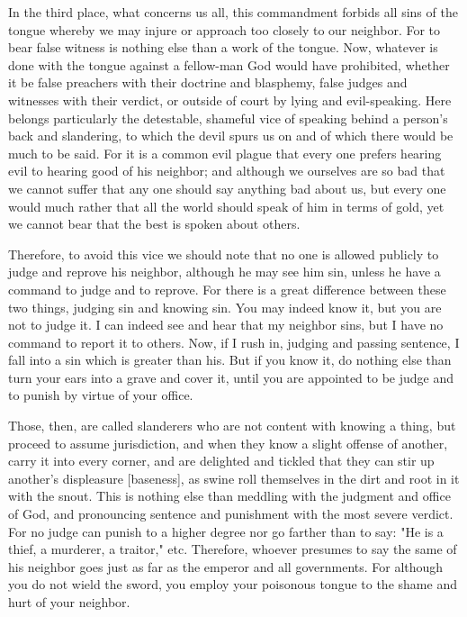 In the third place, what concerns us all, this commandment forbids all
sins of the tongue whereby we may injure or approach too closely to our
neighbor. For to bear false witness is nothing else than a work of the
tongue. Now, whatever is done with the tongue against a fellow-man God
would have prohibited, whether it be false preachers with their
doctrine and blasphemy, false judges and witnesses with their verdict,
or outside of court by lying and evil-speaking. Here belongs
particularly the detestable, shameful vice of speaking behind a
person's back and slandering, to which the devil spurs us on and of
which there would be much to be said. For it is a common evil plague
that every one prefers hearing evil to hearing good of his neighbor;
and although we ourselves are so bad that we cannot suffer that any one
should say anything bad about us, but every one would much rather that
all the world should speak of him in terms of gold, yet we cannot bear
that the best is spoken about others.

Therefore, to avoid this vice we should note that no one is allowed
publicly to judge and reprove his neighbor, although he may see him
sin, unless he have a command to judge and to reprove. For there is a
great difference between these two things, judging sin and knowing sin.
You may indeed know it, but you are not to judge it. I can indeed see
and hear that my neighbor sins, but I have no command to report it to
others. Now, if I rush in, judging and passing sentence, I fall into a
sin which is greater than his. But if you know it, do nothing else
than turn your ears into a grave and cover it, until you are appointed
to be judge and to punish by virtue of your office.

Those, then, are called slanderers who are not content with knowing a
thing, but proceed to assume jurisdiction, and when they know a slight
offense of another, carry it into every corner, and are delighted and
tickled that they can stir up another's displeasure [baseness], as
swine roll themselves in the dirt and root in it with the snout. This
is nothing else than meddling with the judgment and office of God, and
pronouncing sentence and punishment with the most severe verdict. For
no judge can punish to a higher degree nor go farther than to say: "He
is a thief, a murderer, a traitor," etc. Therefore, whoever presumes to
say the same of his neighbor goes just as far as the emperor and all
governments. For although you do not wield the sword, you employ your
poisonous tongue to the shame and hurt of your neighbor.


